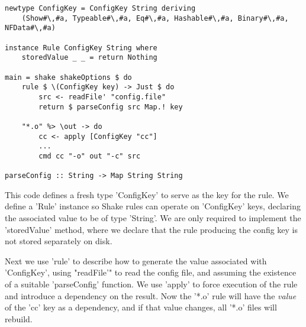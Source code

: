 \begin{lstlisting}
newtype ConfigKey = ConfigKey String deriving
    (Show#\,#a, Typeable#\,#a, Eq#\,#a, Hashable#\,#a, Binary#\,#a, NFData#\,#a)

instance Rule ConfigKey String where
    storedValue _ _ = return Nothing

main = shake shakeOptions $ do
    rule $ \(ConfigKey key) -> Just $ do
        src <- readFile' "config.file"
        return $ parseConfig src Map.! key

    "*.o" %> \out -> do
        cc <- apply [ConfigKey "cc"]
        ...
        cmd cc "-o" out "-c" src

parseConfig :: String -> Map String String
\end{lstlisting}

This code defines a fresh type \lst'ConfigKey' to serve as the key for the rule.
We define a \lst'Rule' instance so Shake rules can operate on \lst'ConfigKey'
keys, declaring the associated value to be of type \lst'String'. We are only
required to implement the \lst'storedValue' method, where we declare that the
rule producing the config key is not stored separately on disk.

Next we use \lst'rule' to describe how to generate the value associated with
\lst'ConfigKey', using \lst"readFile'" to read the config file, and assuming the
existence of a suitable \lst'parseConfig' function. We use \lst'apply' to force
execution of the rule and introduce a dependency on the result.
Now the \lst'*.o' rule will have the \emph{value} of the
\lst'cc' key as a dependency, and if that value changes, all \lst'*.o' files will rebuild.

% 
% 
% 
% 

